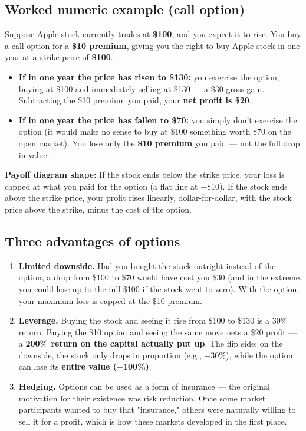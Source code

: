 \documentclass[12pt,openany]{book}
\theoremstyle{definition}
\theoremstyle{remark}
\begin{document}
\subsection{Worked numeric example (call option)}

Suppose Apple stock currently trades at \textbf{\$100}, and you expect it to rise. You buy a call option for a \textbf{\$10 premium}, giving you the right to buy Apple stock in one year at a strike price of \textbf{\$100}.

\begin{itemize}
\item \textbf{If in one year the price has risen to \$130:} you exercise the option, buying at \$100 and immediately selling at \$130 --- a \$30 gross gain. Subtracting the \$10 premium you paid, your \textbf{net profit is \$20}.


\item \textbf{If in one year the price has fallen to \$70:} you simply don't exercise the option (it would make no sense to buy at \$100 something worth \$70 on the open market). You lose only the \textbf{\$10 premium} you paid --- not the full drop in value.


\end{itemize}

\textbf{Payoff diagram shape:} If the stock ends below the strike price, your loss is capped at what you paid for the option (a flat line at \(-\)\$10). If the stock ends above the strike price, your profit rises linearly, dollar-for-dollar, with the stock price above the strike, minus the cost of the option.

\subsection{Three advantages of options}

\begin{enumerate}
\item \textbf{Limited downside.} Had you bought the stock outright instead of the option, a drop from \$100 to \$70 would have cost you \$30 (and in the extreme, you could lose up to the full \$100 if the stock went to zero). With the option, your maximum loss is capped at the \$10 premium.


\item \textbf{Leverage.} Buying the stock and seeing it rise from \$100 to \$130 is a 30\% return. Buying the \$10 option and seeing the same move nets a \$20 profit --- a \textbf{200\% return on the capital actually put up}. The flip side: on the downside, the stock only drops in proportion (e.g., \(-\)30\%), while the option can lose its \textbf{entire value (\(-\)100\%)}.


\item \textbf{Hedging.} Options can be used as a form of insurance --- the original motivation for their existence was risk reduction. Once some market participants wanted to buy that "insurance," others were naturally willing to sell it for a profit, which is how these markets developed in the first place.


\end{enumerate}
\end{document}
